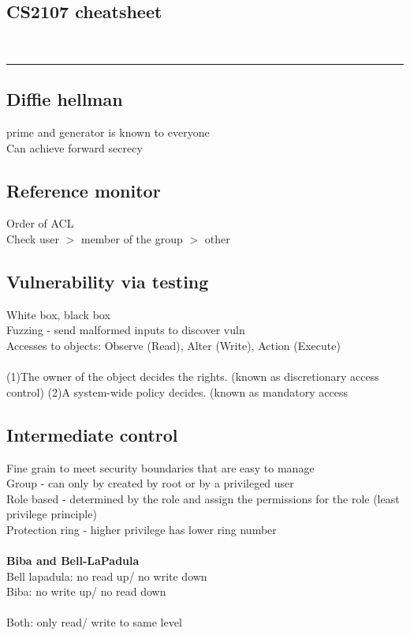 \documentclass[11pt]{article}
\begin{document}
\setlength{\columnsep}{1cm}
\begin{multicols*}{3}
\section*{CS2107 cheatsheet}\\
{\color{Purple} \rule{\linewidth}{0.5mm} }
\subsection*{Diffie hellman}
prime and generator is known to everyone\\
Can achieve forward secrecy
\subsection*{Reference monitor}
Order of ACL\\
Check user $>$ member of the group $>$ other
\subsection*{Vulnerability via testing}
White box, black box\\
Fuzzing - send malformed inputs to discover vuln
\\
Accesses to objects: Observe (Read), Alter (Write), Action (Execute)\\
\\
(1)The owner of the object decides the rights. (known as 
discretionary access control)
(2)A system-wide policy decides.  (known as mandatory access 
\subsection*{ Intermediate control}
Fine grain to meet security boundaries that are easy to manage\\
Group - can only by created by root or by a privileged user\\
Role based - determined by the role and assign the permissions for the role (least privilege principle)\\
Protection ring - higher privilege has lower ring number\\
\\
\textrm{\textbf{ Biba and Bell-LaPadula}}\\
Bell lapadula: no read up/ no write down\\
Biba: no write up/ no read down\\
\\
Both: only read/ write to same level\\

\end{multicols*}
\end{document}
